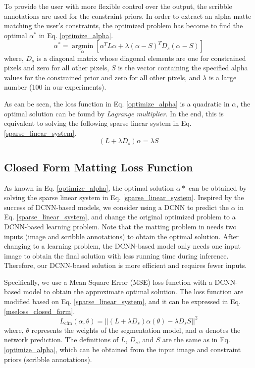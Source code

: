 \documentclass[journal]{IEEEtran}
\DeclareMathOperator*{\argmin}{argmin}
\begin{document}
To provide the user with more flexible control over the output, the scribble annotations are used for the constraint priors. In order to extract an alpha matte matching the user's constraints, the optimized problem has become to find the optimal $\alpha^{*}$ in Eq. \ref{optimize_alpha}.
\begin{equation}
    \alpha^{*} = \argmin\limits_{\alpha} \left[ \alpha^T L \alpha + \lambda (\alpha - S)^T D_s (\alpha - S) \right]
    \label{optimize_alpha}
\end{equation}
where, $D_s$ is a diagonal matrix whose diagonal elements are one for constrained pixels and zero for all other pixels, $S$ is the vector containing the specified alpha values for the constrained prior and zero for all other pixels, and $\lambda$ is a large number (100 in our experiments). 

As can be seen, the loss function in Eq. \ref{optimize_alpha} is a quadratic in $\alpha$, the optimal solution can be found by \textit{Lagrange multiplier}. In the end, this is equivalent to solving the following sparse linear system in Eq. \ref{sparse_linear_system}.
\begin{equation}
    (L + \lambda D_s) \alpha = \lambda S
    \label{sparse_linear_system}
\end{equation}

\subsection{Closed Form Matting Loss Function}
\label{subsec:closed-form-loss}
As known in Eq. \ref{optimize_alpha}, the optimal solution $\alpha*$ can be obtained by solving the sparse linear system in Eq. \ref{sparse_linear_system}. Inspired by the success of DCNN-based models, we consider using a DCNN to predict the $\alpha$ in Eq. \ref{sparse_linear_system}, and change the original optimized problem to a DCNN-based learning problem. Note that the matting problem in \cite{levin2007closed} needs two inputs (image and scribble annotations) to obtain the optimal solution. After changing to a learning problem, the DCNN-based model only needs one input image to obtain the final solution with less running time during inference. Therefore, our DCNN-based solution is more efficient and requires fewer inputs.

Specifically, we use a Mean Square Error (MSE) loss function with a DCNN-based model to obtain the approximate optimal solution. The loss function are modified based on Eq. \ref{sparse_linear_system}, and it can be expressed in Eq. \ref{mseloss_closed_form}.
\begin{equation}
    L_{\text{cfm}}(\alpha, \theta) = ||(L+\lambda D_s) \alpha(\theta) - \lambda D_s S||^2
    \label{mseloss_closed_form}
\end{equation}
where, $\theta$ represents the weights of the segmentation model, and $\alpha$ denotes the network prediction. The definitions of $L$, $D_s$, and $S$ are the same as in Eq. \ref{optimize_alpha}, which can be obtained from the input image and constraint priors (scribble annotations).
\end{document}
